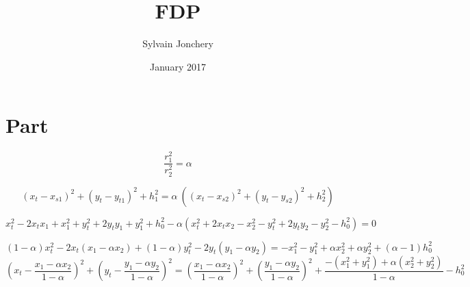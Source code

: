\documentclass{article}
\title{FDP}
\author{Sylvain Jonchery }
\date{January 2017}
\begin{document}
\maketitle

\section{Part}
$$\frac{r_1^2}{r_2^2}=\alpha$$

$$ (x_t-x_{s1})^2+(y_t-y_{t1})^2+h_1^2=\alpha~((x_t-x_{s2})^2+(y_t-y_{s2})^2+h_2^2)$$

$$x_t^2-2 x_t x_1 +x_1^2 + y_t^2+ 2 y_t y_1 + y_1^2 +h_0^2-\alpha( x_t^2+2 x_tx_2-x_2^2 -y_t^2+2 y_t y_2 -y_2^2 - h_0^2)=0$$
  
$$ (1-\alpha)x_t^2 - 2 x_t (x_1 -\alpha x_2) + (1-\alpha) y_t^2 - 2 y_t (y_1-\alpha y_2)= -x_1^2 -y_1^2 +\alpha x_2^2+\alpha y_2^2+(\alpha-1)h_0^2$$
$$(x_t-\frac{x_1-\alpha x_2}{1-\alpha})^2+(y_t-\frac{y_1-\alpha y_2}{1-\alpha})^2=(\frac{x_1-\alpha x_2}{1-\alpha})^2+(\frac{y_1-\alpha y_2}{1-\alpha})^2+\frac{-(x_1^2+ y_1^2)+\alpha (x_2^2+y_2^2)}{1-\alpha}-h_0^2$$
\end{document}
